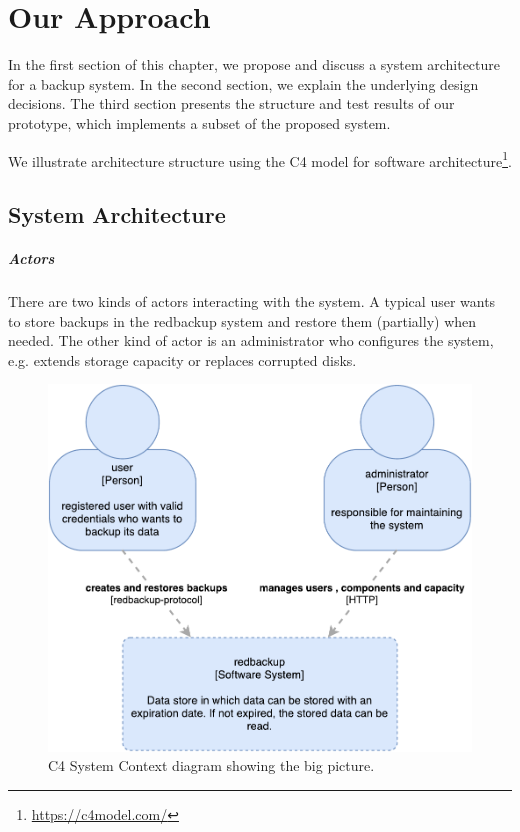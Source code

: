 \chapter{Our Approach}
\label{sec:our-approach}

In the first section of this chapter, we propose and discuss a system architecture for a backup system. In the second section, we explain the underlying design decisions. The third section presents the structure and test results of our prototype, which implements a subset of the proposed system.

We illustrate architecture structure using the C4 model for software architecture\footnote{\url{https://c4model.com/}}.

\section{System Architecture}

\paragraph{Actors} There are two kinds of actors interacting with the system. A typical \gls{user} wants to store backups in the redbackup system and restore them (partially) when needed. The other kind of actor is an \gls{administrator} who configures the system, e.g. extends storage capacity or replaces corrupted disks.

\begin{figure}[h]
	\centering
	\includegraphics[width=0.8\linewidth]{resources/c4-overview}
	\caption[C4 System Context diagram]{C4 System Context diagram showing the big picture.}
	\label{fig:c4-overview}
\end{figure}

